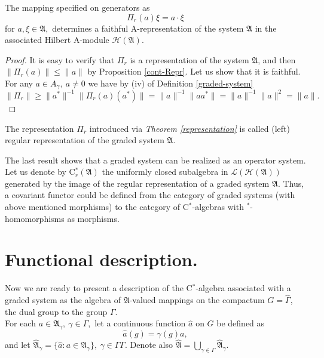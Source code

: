 \documentclass[
11pt,%
tightenlines,%
twoside,%
onecolumn,%
nofloats,%
nobibnotes,%
nofootinbib,%
superscriptaddress,%
noshowpacs,%
centertags]%
{revtex4}
\begin{document}
\begin{theorem}\label{representation}
The mapping specified on generators as
\begin{equation}\label{resentation}\Pi_r(a)\xi = a\cdot  \xi\end{equation}
for  $a, \xi\in \mathfrak A$,\
determines a faithful A-representation of the system $\mathfrak A$  in the associated Hilbert A-module $\mathcal H(\mathfrak A)$.
\end{theorem}
\begin{proof}  It is easy to verify that $\Pi_r$ is a representation of the system $\mathfrak A$, and then $\|\Pi_r (a)\| \leq \| a \|$  by Proposition \ref{cont-Repr}. Let us show that it is faithful. For any $a\in A_\gamma,\ a \neq 0$ we have by (iv) of Definition \ref{graded-system}
    $$\|\Pi_r \| \geq   \| a^* \|^{-1} \| \Pi_r (a)(a^*) \| = \| a \|^{-1} \| a a^* \| =  \| a \|^{-1} \| a \|^2 = \| a \|.
$$
\end{proof}

\begin{definition}
    The representation  $\Pi_r$   introduced via {\em Theorem \ref{representation}} is called (left) regular representation of the graded system $\mathfrak A$.
\end{definition}

\noindent The last result shows that a graded system can be realized as an operator system.
Let us denote by C$^*_r(\mathfrak A)$ the uniformly closed subalgebra in $\mathcal L(\mathcal H(\mathfrak A))$  generated by the image of the regular representation of a graded system $\mathfrak A$.
Thus, a covariant functor could be defined from the category of graded systems (with above mentioned morphisms) to the category of C$^*$-algebras with $^*$-homomorphisms as morphisms.


\section{Functional description.}
Now we are ready to present a description of the C$^*$-algebra associated with a graded system as the  algebra of $\mathfrak A$-valued mappings on the compactum $G= \widehat\Gamma$, the dual group to the group $\Gamma$.\\
For each  $a\in\mathfrak  A_\gamma,\ \gamma\in\Gamma$,\  let a continuous function $\hat a$ on $G$ be defined as
\begin{equation}
\hat a(g) = \gamma(g)a,
\end{equation}
and let  $\widehat{\mathfrak A}_\gamma = \{\hat a: a\in\mathfrak A_\gamma\}, \  \gamma\in\Gamma Γ$.  Denote also  $\widehat{\mathfrak{A}}=\bigcup\limits_{\gamma\in\Gamma} \widehat{\mathfrak A}_\gamma$.
\end{document}
